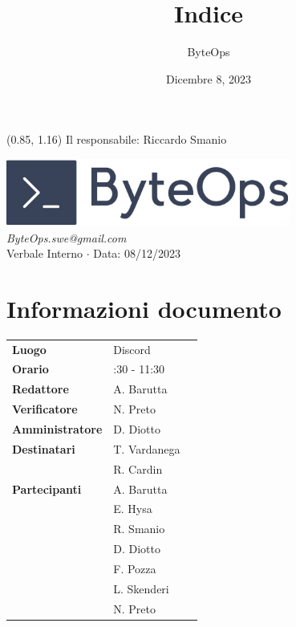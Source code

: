 \documentclass{article}
\title{\textbf{\fontsize{28}{6}\selectfont Indice}}
\author{\fontsize{14}{6}\selectfont ByteOps}
\date{Dicembre 8, 2023}
\begin{document}
\begin{textblock*}{\textwidth}(0.85\textwidth, 1.16\textheight)
    Il responsabile: Riccardo Smanio
\end{textblock*}

\pagestyle{fancy}
\begin{center}
\includegraphics[width = 0.7\textwidth]{../../Images/logo.png} \\
\vspace{0.2cm}
\textcolor[RGB]{60, 60, 60}{\textit{ByteOps.swe@gmail.com}} \\
\vspace{1cm}
\fontsize{16}{6}\selectfont Verbale Interno $\cdot$ Data: 08/12/2023 \\
\vspace{0.5cm}
\end{center}

\section*{Informazioni documento}
\def\arraystretch{1.2}
\begin{tabular}{>{\raggedleft\arraybackslash}p{}|>{\raggedright\arraybackslash}p{}c}
\hline
\addlinespace
\textbf{Luogo} & Discord \vspace{10pt} \\
\textbf{Orario} & 10:30 - 11:30 \vspace{10pt} \\
\textbf{Redattore} & A. Barutta \vspace{10pt} \\
\textbf{Verificatore} & N. Preto \vspace{10pt} \\
\textbf{Amministratore} & D. Diotto \vspace{10pt} \\
\textbf{Destinatari} & T. Vardanega \\ & R. Cardin \vspace{10pt} \\
\textbf{Partecipanti} & A. Barutta \\ & E. Hysa \\ & R. Smanio \\ & D. Diotto \\ & F. Pozza \\ & L. Skenderi \\ & N. Preto \vspace{10pt} \\
\end{tabular}
\pagebreak 
\end{document}
